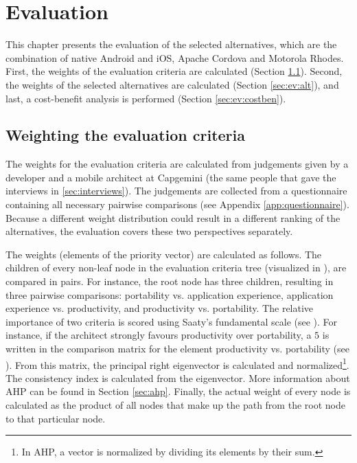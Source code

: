 \chapter{Evaluation}
\label{chap:evaluation}

This chapter presents the evaluation of the selected alternatives, which are the combination of native Android and iOS, Apache Cordova and Motorola Rhodes. First, the weights of the evaluation criteria are calculated (Section \ref{sec:ev:crit}). Second, the weights of the selected alternatives are calculated (Section \ref{sec:ev:alt}), and last, a cost-benefit analysis is performed (Section \ref{sec:ev:costben}).

\section{Weighting the evaluation criteria}
\label{sec:ev:crit}

The weights for the evaluation criteria are calculated from judgements given by a developer and a mobile architect at Capgemini (the same people that gave the interviews in \ref{sec:interviews}). The judgements are collected from a questionnaire containing all necessary pairwise comparisons (see Appendix \ref{app:questionnaire}). Because a different weight distribution could result in a different ranking of the alternatives, the evaluation covers these two perspectives separately. 

The weights (elements of the priority vector) are calculated as follows. The children of every non-leaf node in the evaluation criteria tree (visualized in ), are compared in pairs. For instance, the root node has three children, resulting in three pairwise comparisons: portability vs. application experience, application experience vs. productivity, and productivity vs. portability. The relative importance of two criteria is scored using Saaty's fundamental scale \cite{Saaty:1980, Saaty:1990} (see ). For instance, if the architect strongly favours productivity over portability, a $5$ is written in the comparison matrix for the element productivity vs. portability (see ). From this matrix, the principal right eigenvector is calculated and normalized\footnote{In AHP, a vector is normalized by dividing its elements by their sum.}. The consistency index is calculated from the eigenvector. More information about AHP can be found in Section \ref{sec:ahp}. Finally, the actual weight of every node is calculated as the product of all nodes that make up the path from the root node to that particular node.  

